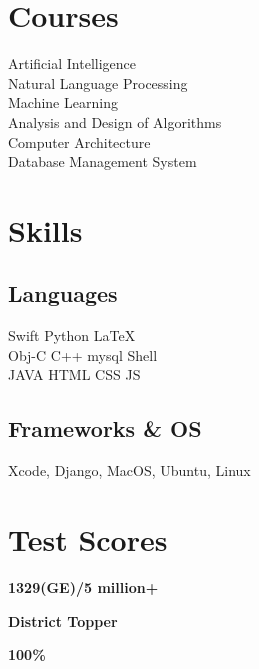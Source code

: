\documentclass[]{Kauts}
\begin{document}
\begin{minipage}[t]{0.3\textwidth}

\section{Courses}
Artificial Intelligence\\
Natural Language Processing\\
Machine Learning\\
Analysis and Design of Algorithms\\
Computer Architecture\\
Database Management System\\


\section{Skills}
\subsection{Languages}
Swift \textbullet{}   Python \textbullet{} \LaTeX\ \\
Obj-C \textbullet{} C++ \textbullet{} mysql \textbullet{} Shell \\
JAVA \textbullet{}  HTML \textbullet{} CSS \textbullet{}  JS
\sectionsep

\subsection{Frameworks \& OS}
Xcode, Django, MacOS, Ubuntu, Linux

\section{Test Scores}
 \textbf{1329(GE)/5 million+}


 \textbf{District Topper}

 \textbf{100\%} 

%
%

\end{minipage} 
\end{document}
